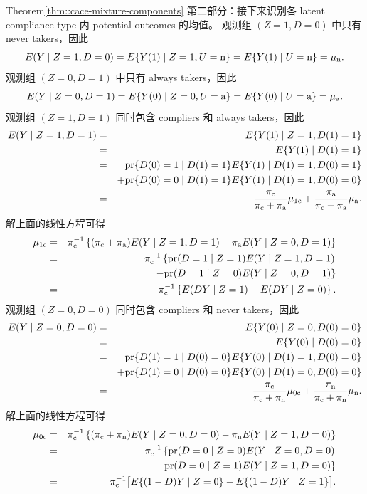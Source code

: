 \begin{myproof}{Theorem}{\cref{thm::cace-mixture-components}}
第二部分：接下来识别各 latent compliance type 内 potential outcomes 的均值。
观测组 $(Z=1,D=0)$ 中只有 never takers，因此
$$
E(Y\mid Z=1, D=0) = E\{  Y(1) \mid Z=1, U=\textup{n} \} = E\{  Y(1) \mid   U=\textup{n} \}  =
\mu_{\textup{n}}  . 
$$
观测组 $(Z=0,D=1)$ 中只有 always takers，因此
$$
E(Y\mid Z=0, D=1) = E\{  Y(0) \mid Z=0, U=\textup{a} \} = E\{  Y(0) \mid   U=\textup{a} \}  =
\mu_{\textup{a}} . 
$$
观测组 $(Z=1,D=1)$ 同时包含 compliers 和 always takers，因此
\begin{eqnarray*}
E(Y\mid Z=1, D=1) &=& E\{ Y(1)\mid Z=1, D(1)=1\} \\
&=& E\{ Y(1)\mid D(1)=1\}  \\   
&=& \textup{pr}\{  D(0)=1 \mid D(1)=1 \} E\{ Y(1)\mid D(1)=1, D(0)=1\}  \\
&&+ \textup{pr}\{  D(0)=0 \mid D(1)=1 \}E\{ Y(1)\mid D(1)=1, D(0)=0\}   \\
&=& \frac{\pi_{\textup{c}}}{\pi_{\textup{c}} + \pi_{\textup{a}}} \mu_{1\textup{c}} +  \frac{\pi_{\textup{a}}}{\pi_{\textup{c}} + \pi_{\textup{a}}} \mu_{\textup{a}}.
\end{eqnarray*}
解上面的线性方程可得
\begin{eqnarray*}
\mu_{1\textup{c}} &=& \pi_{\textup{c}}^{-1} \left\{  (\pi_{\textup{c}} + \pi_{\textup{a}})  E(Y\mid Z=1, D=1)  - \pi_{\textup{a}}    E(Y\mid Z=0, D=1)    \right\} \\
&=& \pi_{\textup{c}}^{-1} \left\{  \textup{pr}(D=1\mid Z=1)  E(Y\mid Z=1, D=1) \right.\\
&&\left. \qquad  -\textup{pr}(D=1\mid Z=0) E(Y\mid Z=0, D=1)    \right\} \\
&=&  \pi_{\textup{c}}^{-1}\left\{   E(DY\mid Z=1 )  -  E(DY\mid Z=0)    \right\}.
\end{eqnarray*}
观测组 $(Z=0,D=0)$ 同时包含 compliers 和 never takers，因此
\begin{eqnarray*}
E(Y\mid Z=0,D=0) &=& E\{ Y(0)\mid Z=0, D(0)=0\} \\
&=& E\{ Y(0)\mid D(0)=0\} \\ 
&=& \textup{pr}\{  D(1)=1 \mid D(0)=0 \} E\{ Y(0)\mid D(1)=1, D(0)=0\}  \\
&&+ \textup{pr}\{  D(1)=0 \mid D(0)= 0\}E\{ Y(0)\mid D(1)=0, D(0)=0\}   \\
&=& \frac{\pi_{\textup{c}}}{\pi_{\textup{c}} + \pi_{\textup{n}}} \mu_{0\textup{c}} +  \frac{\pi_{\textup{n}}}{\pi_{\textup{c}} + \pi_{\textup{n}}} \mu_{\textup{n}}.
\end{eqnarray*}
解上面的线性方程可得
\begin{eqnarray*}
\mu_{0\textup{c}}  &=& \pi_{\textup{c}}^{-1} \left\{  (\pi_{\textup{c}} + \pi_{\textup{n}})  E(Y\mid Z=0, D=0)  - \pi_{\textup{n}}    E(Y\mid Z=1, D=0)    \right\} \\
&=& \pi_{\textup{c}}^{-1} \left\{ \textup{pr}(D=0\mid Z=0)  E(Y\mid Z=0, D=0)  \right.\\
&&\left. \qquad  -\textup{pr}(D=0\mid Z=1)   E(Y\mid Z=1, D=0)    \right\} \\
&=& \pi_{\textup{c}}^{-1} \big[   E\{ (1-D)Y\mid Z=0 \}  -  E\{(1-D)Y\mid Z=1 \}    \big]. 
\end{eqnarray*}
\end{myproof}

